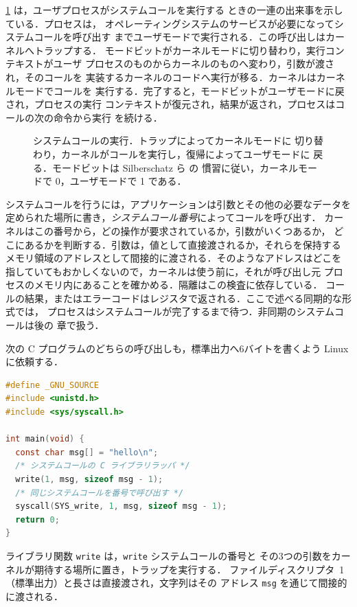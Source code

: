 \documentclass[../main.tex]{subfiles}
\begin{document}
\cref{fig:l01-syscall-flow} は，ユーザプロセスがシステムコールを実行する
ときの一連の出来事を示している．プロセスは，
オペレーティングシステムのサービスが必要になってシステムコールを呼び出す
までユーザモードで実行される．この呼び出しはカーネルへトラップする．
モードビットがカーネルモードに切り替わり，実行コンテキストがユーザ
プロセスのものからカーネルのものへ変わり，引数が渡され，そのコールを
実装するカーネルのコードへ実行が移る．カーネルはカーネルモードでコールを
実行する．完了すると，モードビットがユーザモードに戻され，プロセスの実行
コンテキストが復元され，結果が返され，プロセスはコールの次の命令から実行
を続ける．

\begin{figure}[htbp]
  \centering
  
  \caption{システムコールの実行．トラップによってカーネルモードに
    切り替わり，カーネルがコールを実行し，復帰によってユーザモードに
    戻る．モードビットは Silberschatz ら \cite{silberschatz2018} の
    慣習に従い，カーネルモードで 0，ユーザモードで 1 である．}
  \label{fig:l01-syscall-flow}
\end{figure}

システムコールを行うには，アプリケーションは引数とその他の必要なデータを
定められた場所に書き，\emph{システムコール番号}によってコールを呼び出す．
カーネルはこの番号から，どの操作が要求されているか，引数がいくつあるか，
どこにあるかを判断する．引数は，値として直接渡されるか，それらを保持する
メモリ領域のアドレスとして間接的に渡される．そのようなアドレスはどこを
指していてもおかしくないので，カーネルは使う前に，それが呼び出し元
プロセスのメモリ内にあることを確かめる．隔離はこの検査に依存している．
コールの結果，またはエラーコードはレジスタで返される．ここで述べる同期的な形式では，
プロセスはシステムコールが完了するまで待つ．非同期のシステムコールは後の
章で扱う．

\begin{example}
  次の C プログラムのどちらの呼び出しも，標準出力へ6バイトを書くよう
  Linux に依頼する．
  \begin{lstlisting}[language=C, numbers=none]
#define _GNU_SOURCE
#include <unistd.h>
#include <sys/syscall.h>

int main(void) {
  const char msg[] = "hello\n";
  /* システムコールの C ライブラリラッパ */
  write(1, msg, sizeof msg - 1);
  /* 同じシステムコールを番号で呼び出す */
  syscall(SYS_write, 1, msg, sizeof msg - 1);
  return 0;
}
\end{lstlisting}
  ライブラリ関数 \texttt{write} は，\texttt{write} システムコールの番号と
  その3つの引数をカーネルが期待する場所に置き，トラップを実行する．
  ファイルディスクリプタ~1（標準出力）と長さは直接渡され，文字列はその
  アドレス \texttt{msg} を通じて間接的に渡される．
\end{example}
\end{document}
